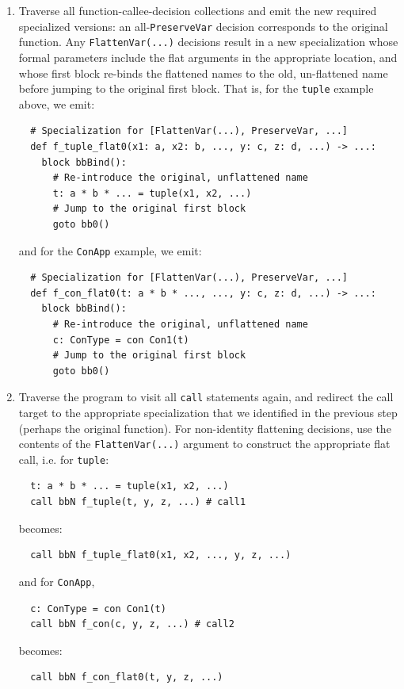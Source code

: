 \documentclass[leqno,11pt]{article}
\begin{document}
\begin{enumerate}
\item Traverse all function-callee-decision collections and emit the new
  required specialized versions: an all-\texttt{PreserveVar} decision
  corresponds to the original function. Any \texttt{FlattenVar(...)} decisions
  result in a new specialization whose formal parameters include the flat
  arguments in the appropriate location, and whose first block re-binds the
  flattened names to the old, un-flattened name before jumping to the original
  first block. That is, for the \texttt{tuple} example above, we emit:
\begin{verbatim}
  # Specialization for [FlattenVar(...), PreserveVar, ...]
  def f_tuple_flat0(x1: a, x2: b, ..., y: c, z: d, ...) -> ...:
    block bbBind():
      # Re-introduce the original, unflattened name
      t: a * b * ... = tuple(x1, x2, ...)
      # Jump to the original first block
      goto bb0()
\end{verbatim}
and for the \texttt{ConApp} example, we emit:
\begin{verbatim}
  # Specialization for [FlattenVar(...), PreserveVar, ...]
  def f_con_flat0(t: a * b * ..., ..., y: c, z: d, ...) -> ...:
    block bbBind():
      # Re-introduce the original, unflattened name
      c: ConType = con Con1(t)
      # Jump to the original first block
      goto bb0()
\end{verbatim}

\item Traverse the program to visit all \texttt{call} statements again, and
  redirect the call target to the appropriate specialization that we identified
  in the previous step (perhaps the original function). For non-identity
  flattening decisions, use the contents of the \texttt{FlattenVar(...)}
  argument to construct the appropriate flat call, i.e. for \texttt{tuple}:
\begin{verbatim}
  t: a * b * ... = tuple(x1, x2, ...)
  call bbN f_tuple(t, y, z, ...) # call1
\end{verbatim}
becomes:
\begin{verbatim}
  call bbN f_tuple_flat0(x1, x2, ..., y, z, ...)
\end{verbatim}
and for \texttt{ConApp}, 
\begin{verbatim}
  c: ConType = con Con1(t)
  call bbN f_con(c, y, z, ...) # call2
\end{verbatim}
becomes:
\begin{verbatim}
  call bbN f_con_flat0(t, y, z, ...)
\end{verbatim}


\end{enumerate}
\end{document}

